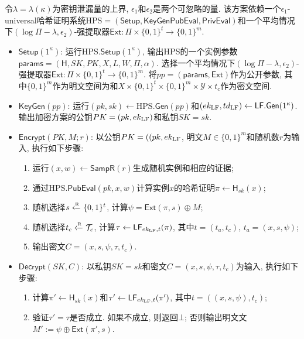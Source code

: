 \begin{definition}
令$\lambda = \lambda(\kappa)$为密钥泄漏量的上界, $\epsilon_1$和$\epsilon_2$是两个可忽略的量. 该方案依赖一个$\epsilon_1$-universal哈希证明系统$\text{HPS} = (\mathsf{Setup}, \mathsf{KeyGen} \mathsf{PubEval}, \mathsf{PrivEval})$和一个平均情况下$(\log\Pi-\lambda, \epsilon_2)$-强提取器$\mathsf{Ext}: \Pi\times\{0, 1\}^t\rightarrow\{0, 1\}^m$.
\begin{itemize}
\item $\mathsf{Setup}(1^\kappa)$: 运行$\text{HPS}.\mathsf{Setup}(1^\kappa)$, 输出HPS的一个实例参数$\mathsf{params} = (\mathsf{H}, SK, PK, X, L, W, \Pi, \alpha)$. 选择一个平均情况下$(\log\Pi-\lambda, \epsilon_2)$-强提取器$\mathsf{Ext}: \Pi\times\{0, 1\}^t\rightarrow\{0, 1\}^m$. 将$pp =(\mathsf{params}, \mathsf{Ext})$作为公开参数, 其中$\{0, 1\}^m$作为明文空间为和$X \times \{0, 1\}^t \times \{0, 1\}^m \times \mathcal{Y} \times t_c$作为密文空间.

\item $\mathsf{KeyGen}(pp)$: 运行$(pk, sk) \leftarrow \text{HPS}.\mathsf{Gen}(pp)$和$(ek_{\text{LF}},td_{\text{LF}}) \leftarrow \mathsf{LF.Gen}(1^\kappa)$. 输出加密方案的公钥$PK=(pk,ek_{\text{LF}})$和私钥$SK=sk$. 
  
\item $\mathsf{Encrypt}(PK, M; r)$: 以公钥$PK = ((pk, ek_{\text{LF}}$, 明文$M \in \{0, 1\}^m$和随机数$r$为输入, 执行如下步骤:
\begin{enumerate}
    \item 运行$(x, w) \leftarrow \mathsf{SampR}(r)$生成随机实例和相应的证据;
    \item 通过$\text{HPS}.\mathsf{PubEval}(pk, x, w)$计算实例$x$的哈希证明$\pi \leftarrow \mathsf{H}_{sk}(x)$; 
    \item 随机选择$s \xleftarrow{\textup{\tiny R}} \{0, 1\}^t$, 计算$\psi=\mathsf{Ext}(\pi, s)\oplus M$;
    \item 随机选择$t_c \xleftarrow{\textup{\tiny R}} \mathcal{T}_c$, 计算$\tau \leftarrow \mathsf{LF}_{ek_{\text{LF}}, t}(\pi)$, 其中$t = (t_a, t_c)$, $t_a = (x, s, \psi)$;
    \item 输出密文$C = (x, s, \psi, \tau, t_c)$. 
\end{enumerate} 

\item $\mathsf{Decrypt}(SK, C)$: 以私钥$SK = sk$和密文$C = (x, s, \psi, \tau, t_c)$为输入, 执行如下步骤:
\begin{enumerate}
    \item 计算$\pi' \leftarrow \mathsf{H}_{sk}(x)$和$\tau' \leftarrow \mathsf{LF}_{ek_{\text{LF}}, t}(\pi')$, 其中$t = ((x, s, \psi), t_c)$;
    \item 验证$\tau' = \tau$是否成立. 如果不成立, 则返回$\bot$; 否则输出明文文$M':= \psi \oplus \mathsf{Ext}(\pi', s)$.
\end{enumerate} 
\end{itemize}
\end{definition}


